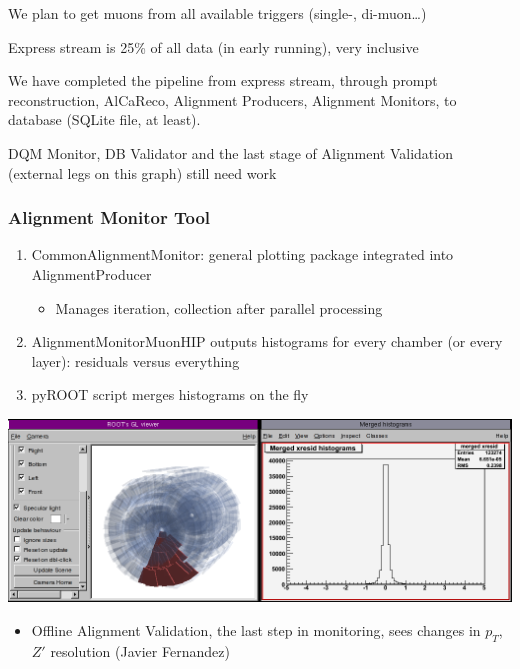 \documentclass[compress]{beamer}
\begin{document}
\begin{notes}
\item We plan to get muons from all available triggers (single-, di-muon\ldots)
\item Express stream is 25\% of all data (in early running), very inclusive
\item We have completed the pipeline from express stream, through
prompt reconstruction, AlCaReco, Alignment Producers, Alignment
Monitors, to database (SQLite file, at least).
\item DQM Monitor, DB Validator and the last stage of Alignment
Validation (external legs on this graph) still need work
\end{notes}

\begin{frame}
\frametitle{Alignment Monitor Tool}
\begin{enumerate}
\item CommonAlignmentMonitor: general plotting package integrated into AlignmentProducer
\begin{itemize}
\item Manages iteration, collection after parallel processing
\end{itemize}
\item AlignmentMonitorMuonHIP outputs histograms for every chamber (or every layer): residuals versus everything
\item pyROOT script merges histograms on the fly
\end{enumerate}
\begin{center}
\includegraphics[width=0.8\linewidth]{realplots/monitoring_tool}
\end{center}
\begin{itemize}
\item Offline Alignment Validation, the last step in monitoring, sees changes in $p_T$, $Z'$ resolution (Javier Fernandez)
\end{itemize}
\end{frame}
\end{document}
